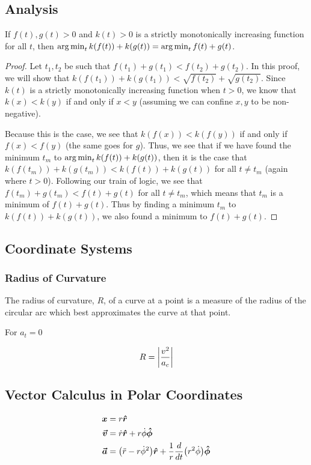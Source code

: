 \subsection{Analysis}

\begin{lemma}\label{lemma:conv-argmin}
  If $f(t), g(t) > 0$ and $k(t) > 0$ is a strictly monotonically increasing function for all $t$, then $\operatorname*{arg\,min}_t k(f(t)) + k(g(t)) = \operatorname*{arg\,min}_t f(t) + g(t)$.
  \label{lemma:minsqrt}
\end{lemma}
\begin{proof}
Let $t_1, t_2$ be such that $f(t_1) + g(t_1) < f(t_2) + g(t_2)$. In this proof, we will show that $k(f(t_1)) + k(g(t_1)) < \sqrt{f(t_2)} + \sqrt{g(t_2)}$. Since $k(t)$ is a strictly monotonically increasing function when $t > 0$, we know that $k(x) < k(y)$ if and only if $x < y$ (assuming we can confine $x, y$ to be non-negative).

Because this is the case, we see that $k(f(x)) < k(f(y))$ if and only if $f(x) < f(y)$ (the same goes for $g$). Thus, we see that if we have found the minimum $t_m$ to $\operatorname*{arg\,min}_t k(f(t)) + k(g(t))$, then it is the case that $k(f(t_m)) + k(g(t_m)) < k(f(t)) + k(g(t))$ for all $t \neq t_m$ (again where $t > 0$). Following our train of logic, we see that $f(t_m) + g(t_m) < f(t) + g(t)$ for all $t \neq t_m$, which means that $t_m$ is a minimum of $f(t) + g(t)$. Thus by finding a minimum $t_m$ to $k(f(t)) + k(g(t))$, we also found a minimum to $f(t) + g(t)$.
\end{proof}

\subsection{Coordinate Systems} 

\subsubsection{Radius of Curvature}

The radius of curvature, $R$, of a curve at a point is a measure of the radius of the circular arc which best approximates the curve at that point.

For $a_t = 0$

\[
R= \abs{\frac{v^2}{a_c}}
\]

\subsection{Vector Calculus in Polar Coordinates}

\begin{align*}
\boldsymbol{x}& = r \boldsymbol{\hat{r}}\\
\boldsymbol{\vec{v}}& = \dot{r} \boldsymbol{\hat{r}} + r \dot{\phi} \boldsymbol{\hat{\phi}}\\
\label{eq:a_vec_def}\boldsymbol{\vec{a}}& = \paren{\ddot{r} - r \dot{\phi}^2} \boldsymbol{\hat{r}} + \frac{1}{r} \frac{d}{dt} \paren{r^2 \dot{\phi}} \boldsymbol{\hat{\phi}}
\end{align*}